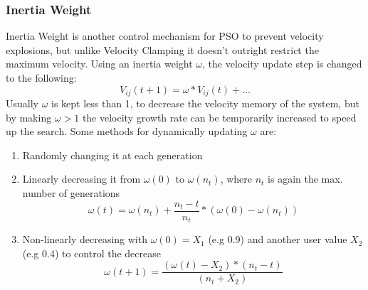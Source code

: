 \subsubsection{Inertia Weight}
Inertia Weight is another control mechanism for PSO to prevent velocity explosions, but unlike Velocity Clamping it doesn't outright restrict the maximum velocity. Using an inertia weight $\omega$, the velocity update step is changed to the following:
\begin{equation}
    V_{ij}(t+1) = \omega * V_{ij}(t) + \dots 
\end{equation}
Usually $\omega$ is kept less than 1, to decrease the velocity memory of the system, but by making $\omega > 1$ the velocity growth rate can be temporarily increased to speed up the search. Some methods for dynamically updating $\omega$ are:
\begin{enumerate}
    \item Randomly changing it at each generation
    \item Linearly decreasing it from $\omega(0)$ to $\omega(n_t)$, where $n_t$ is again the max. number of generations
    \begin{equation}
        \omega(t) = \omega(n_t) + \frac{n_t-t}{n_t} * (\omega(0) - \omega(n_t)) \nonumber
    \end{equation}
    \item Non-linearly decreasing with $\omega(0) = X_1$ (e.g 0.9) and another user value $X_2$(e.g 0.4) to control the decrease
    \begin{equation}
        \omega(t+1) = \frac{ (\omega(t)-X_2) * (n_t - t) }{ (n_t + X_2)} \nonumber
    \end{equation}
\end{enumerate}